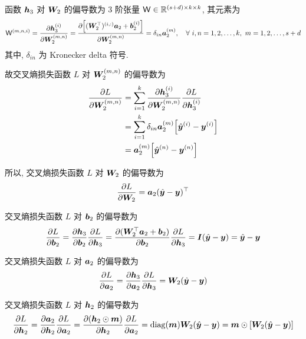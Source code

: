\documentclass{article}
\begin{document}
函数 $\bm{h}_3$ 对 $\bm{W}_2$ 的偏导数为 3 阶张量 $\mathsf{W}\in\mathbb{R}^{(s+d)\times k\times k}$, 其元素为
\begin{equation}
  \mathsf{W}^{(m,n,i)}=\frac{\partial \bm{h}_3^{(i)}}{\partial \bm{W}_2^{(m,n)}}=\frac{\partial \Big[(\bm{W}_2^\top)^{(i,:)}\bm{a}_2+\bm{b}_2^{(i)}\Big]}{\partial \bm{W}_2^{(m,n)}}=\delta_{in}\bm{a}_2^{(m)},\quad\forall~i,n=1,2,\dots,k,~m=1,2,\dots,s+d
\end{equation}
其中, $\delta_{in}$ 为 Kronecker delta 符号.

故交叉熵损失函数 $L$ 对 $\bm{W}_2^{(m,n)}$ 的偏导数为
\begin{equation}
  \begin{aligned}
    \frac{\partial L}{\partial\bm{W}_2^{(m,n)}}
    &=\sum_{i=1}^k\frac{\partial\bm{h}_3^{(i)}}{\partial\bm{W}_2^{(m,n)}}\frac{\partial L}{\partial\bm{h}_3^{(i)}}\\
    &=\sum_{i=1}^k \delta_{in}\bm{a}_2^{(m)} \Big[\hat{\bm{y}}^{(i)}-\bm{y}^{(i)}\Big]\\
    &=\bm{a}_2^{(m)} \Big[\hat{\bm{y}}^{(n)}-\bm{y}^{(n)}\Big]\\
  \end{aligned}
\end{equation}

所以, 交叉熵损失函数 $L$ 对 $\bm{W}_2$ 的偏导数为
\begin{equation}
  \frac{\partial L}{\partial \bm{W}_2}=\bm{a}_2(\hat{\bm{y}}-\bm{y})^\top
  \label{eq:partialLossWeight}
\end{equation}

交叉熵损失函数 $L$ 对 $\bm{b}_2$ 的偏导数为
\begin{equation}
  \frac{\partial L}{\partial \bm{b}_2}=\frac{\partial\bm{h}_3}{\partial\bm{b}_2}\frac{\partial L}{\partial \bm{h}_3}=\frac{\partial(\bm{W}_2^\top\bm{a}_2+\bm{b}_2)}{\partial\bm{b}_2}\frac{\partial L}{\partial \bm{h}_3}=\bm{I}(\hat{\bm{y}}-\bm{y})=\hat{\bm{y}}-\bm{y}
\end{equation}

交叉熵损失函数 $L$ 对 $\bm{a}_2$ 的偏导数为
\begin{equation}
  \frac{\partial L}{\partial \bm{a}_2}=\frac{\partial\bm{h}_3}{\partial\bm{a}_2}\frac{\partial L}{\partial \bm{h}_3}=\bm{W}_2(\hat{\bm{y}}-\bm{y})
\end{equation}

交叉熵损失函数 $L$ 对 $\bm{h}_2$ 的偏导数为
\begin{equation}
  \frac{\partial L}{\partial \bm{h}_2}=\frac{\partial\bm{a}_2}{\partial\bm{h}_2}\frac{\partial L}{\partial \bm{a}_2}=\frac{\partial(\bm{h}_2\odot\bm{m})}{\partial\bm{h}_2}\frac{\partial L}{\partial \bm{a}_2}=\operatorname{diag}(\bm{m})\bm{W}_2(\hat{\bm{y}}-\bm{y})=\bm{m}\odot[\bm{W}_2(\hat{\bm{y}}-\bm{y})]
\end{equation}
\end{document}

